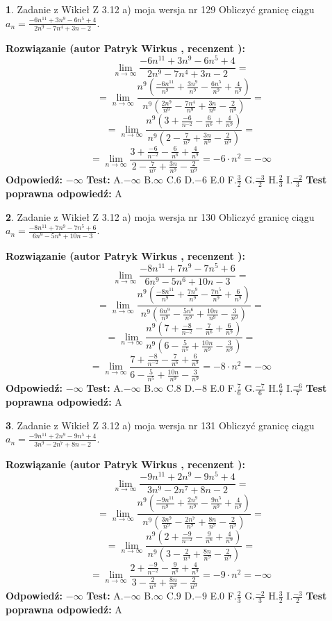 \documentclass[12pt, a4paper]{article}
\theoremstyle{definition} %
\newtheorem{zad}{}
\newcommand{\zadStart}[1]{\begin{zad}#1\newline}
\newcommand{\zadStop}{\end{zad}}
\newcommand{\rozwStart}[2]{\noindent \textbf{Rozwiązanie (autor #1 , recenzent #2): }\newline}
\newcommand{\rozwStop}{\newline}
\newcommand{\odpStart}{\noindent \textbf{Odpowiedź:}\newline}
\newcommand{\odpStop}{\newline}
\newcommand{\testStart}{\noindent \textbf{Test:}\newline}
\newcommand{\testStop}{\newline}
\newcommand{\kluczStart}{\noindent \textbf{Test poprawna odpowiedź:}\newline}
\newcommand{\kluczStop}{\newline}
\begin{document}
\zadStart{Zadanie z Wikieł Z 3.12 a) moja wersja nr 129}
Obliczyć granicę ciągu $a_{n}=\frac{-6n^{11}+3n^{9}-6n^{5}+4}{2n^{9}-7n^{4}+3n-2}$.
\zadStop
\rozwStart{Patryk Wirkus}{}
$$\lim\limits_{n\to\infty}\frac{-6n^{11}+3n^{9}-6n^{5}+4}{2n^{9}-7n^{4}+3n-2}=$$
$$=\lim\limits_{n\to\infty}\frac{n^{9}\left(\frac{-6n^{11}}{n^{9}}+\frac{3n^{9}}{n^{9}}-\frac{6n^{5}}{n^{9}}+\frac{4}{n^{9}}\right)}{n^{9}\left(\frac{2n^{9}}{n^{9}}-\frac{7n^{4}}{n^{9}}+\frac{3n}{n^{9}}-\frac{2}{n^{9}}\right)}=$$
$$=\lim\limits_{n\to\infty}\frac{n^{9}\left(3+\frac{-6}{n^{-2}}-\frac{6}{n^{6}}+\frac{4}{n^{9}}\right)}
{n^{9}\left(2-\frac{7}{n^{7}}+\frac{3n}{n^{9}}-\frac{2}{n^{9}}\right)}=$$
$$=\lim\limits_{n\to\infty}\frac{3+\frac{-6}{n^{-2}}-\frac{6}{n^{6}}+\frac{4}{n^{9}}}{2-\frac{7}{n^{7}}+\frac{3n}{n^{9}}-\frac{2}{n^{9}}}=-6\cdot n^{2} = -\infty$$
\rozwStop
\odpStart
$-\infty$
\odpStop
\testStart
A.$-\infty$
B.$\infty$
C.$6$
D.$-6$
E.$0$
F.$\frac{3}{2}$
G.$\frac{-3}{2}$
H.$\frac{2}{3}$
I.$\frac{-2}{3}$
\testStop
\kluczStart
A
\kluczStop



\zadStart{Zadanie z Wikieł Z 3.12 a) moja wersja nr 130}
Obliczyć granicę ciągu $a_{n}=\frac{-8n^{11}+7n^{9}-7n^{5}+6}{6n^{9}-5n^{6}+10n-3}$.
\zadStop
\rozwStart{Patryk Wirkus}{}
$$\lim\limits_{n\to\infty}\frac{-8n^{11}+7n^{9}-7n^{5}+6}{6n^{9}-5n^{6}+10n-3}=$$
$$=\lim\limits_{n\to\infty}\frac{n^{9}\left(\frac{-8n^{11}}{n^{9}}+\frac{7n^{9}}{n^{9}}-\frac{7n^{5}}{n^{9}}+\frac{6}{n^{9}}\right)}{n^{9}\left(\frac{6n^{9}}{n^{9}}-\frac{5n^{6}}{n^{9}}+\frac{10n}{n^{9}}-\frac{3}{n^{9}}\right)}=$$
$$=\lim\limits_{n\to\infty}\frac{n^{9}\left(7+\frac{-8}{n^{-2}}-\frac{7}{n^{6}}+\frac{6}{n^{9}}\right)}
{n^{9}\left(6-\frac{5}{n^{5}}+\frac{10n}{n^{9}}-\frac{3}{n^{9}}\right)}=$$
$$=\lim\limits_{n\to\infty}\frac{7+\frac{-8}{n^{-2}}-\frac{7}{n^{6}}+\frac{6}{n^{9}}}{6-\frac{5}{n^{5}}+\frac{10n}{n^{9}}-\frac{3}{n^{9}}}=-8\cdot n^{2} = -\infty$$
\rozwStop
\odpStart
$-\infty$
\odpStop
\testStart
A.$-\infty$
B.$\infty$
C.$8$
D.$-8$
E.$0$
F.$\frac{7}{6}$
G.$\frac{-7}{6}$
H.$\frac{6}{7}$
I.$\frac{-6}{7}$
\testStop
\kluczStart
A
\kluczStop



\zadStart{Zadanie z Wikieł Z 3.12 a) moja wersja nr 131}
Obliczyć granicę ciągu $a_{n}=\frac{-9n^{11}+2n^{9}-9n^{5}+4}{3n^{9}-2n^{7}+8n-2}$.
\zadStop
\rozwStart{Patryk Wirkus}{}
$$\lim\limits_{n\to\infty}\frac{-9n^{11}+2n^{9}-9n^{5}+4}{3n^{9}-2n^{7}+8n-2}=$$
$$=\lim\limits_{n\to\infty}\frac{n^{9}\left(\frac{-9n^{11}}{n^{9}}+\frac{2n^{9}}{n^{9}}-\frac{9n^{5}}{n^{9}}+\frac{4}{n^{9}}\right)}{n^{9}\left(\frac{3n^{9}}{n^{9}}-\frac{2n^{7}}{n^{9}}+\frac{8n}{n^{9}}-\frac{2}{n^{9}}\right)}=$$
$$=\lim\limits_{n\to\infty}\frac{n^{9}\left(2+\frac{-9}{n^{-2}}-\frac{9}{n^{6}}+\frac{4}{n^{9}}\right)}
{n^{9}\left(3-\frac{2}{n^{4}}+\frac{8n}{n^{9}}-\frac{2}{n^{9}}\right)}=$$
$$=\lim\limits_{n\to\infty}\frac{2+\frac{-9}{n^{-2}}-\frac{9}{n^{6}}+\frac{4}{n^{9}}}{3-\frac{2}{n^{4}}+\frac{8n}{n^{9}}-\frac{2}{n^{9}}}=-9\cdot n^{2} = -\infty$$
\rozwStop
\odpStart
$-\infty$
\odpStop
\testStart
A.$-\infty$
B.$\infty$
C.$9$
D.$-9$
E.$0$
F.$\frac{2}{3}$
G.$\frac{-2}{3}$
H.$\frac{3}{2}$
I.$\frac{-3}{2}$
\testStop
\kluczStart
A
\kluczStop
\end{document}
